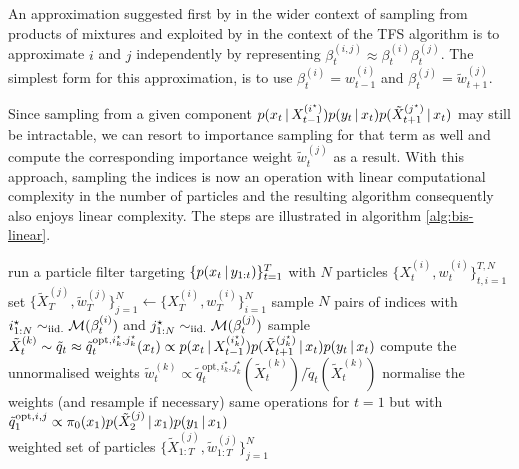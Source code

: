 An approximation suggested first by \citet{briers05} in the wider context of sampling from products of mixtures and exploited by \citet{fearnhead10, taghavi12} in the context of the TFS algorithm is to approximate $i$ and $j$ independently by representing $\beta^{(i,j)}_{t}\approx \beta^{(i)}_{t}\beta^{(j)}_{t}$. The simplest form for this approximation, is to use $\beta^{(i)}_{t} = w^{(i)}_{t-1}$ and $\beta^{(j)}_{t}=\tilde w^{(j)}_{t+1}$. 

Since sampling from a given component $p(x_{t}\,|\, X^{(i^{\star})}_{t-1})p(y_{t}\,|\, x_{t})p(\tilde X^{(j^{\star})}_{t+1}\,|\, x_{t})$ may still be intractable, we can resort to importance sampling for that term as well and compute the corresponding importance weight $\tilde w_{t}^{(j)}$ as a result.
With this approach, sampling the indices is now an operation with linear computational complexity in the number of particles and the resulting algorithm consequently also enjoys linear complexity. 
The steps are illustrated in algorithm \ref{alg:bis-linear}. 
%
\begin{algorithm}[!h]\small
	\caption{\label{alg:bis-linear}}
	\begin{algorithmic}[1]
		\State run a particle filter targeting $\{p(x_{t}\,|\, y_{1:t})\}_{t=1}^{T}$ with $N$ particles $\{X^{(i)}_{t}, w^{(i)}_{t}\}_{t,i=1}^{T,N}$
		\State set $\{\tilde X^{(j)}_{T},\tilde w^{(j)}_{T}\}_{j=1}^{N}\leftarrow \{X^{(i)}_{T},w^{(i)}_{T}\}_{i=1}^{N}$
			\State sample $N$ pairs of indices with $i^{\star}_{1:N} \sim_{\mathrm{iid.}} \mathcal M(\beta^{(i)}_{t})$ and $j^{\star}_{1:N}\sim_{\mathrm{iid.}} \mathcal M(\beta^{(j)}_{t})$
				\State sample $\tilde X^{(k)}_{t}\sim \tilde  q_{t} \approx \tilde q_{t}^{\text{opt}, i^{\star}_{k}, j^{\star}_{k}}(x_{t}) \propto p(x_{t}\,|\, X^{(i^{\star}_{k})}_{t-1})p(\tilde X^{(j^{\star}_{k})}_{t+1}\,|\, x_{t})p(y_{t}\,|\, x_{t})$
	    			\State compute the unnormalised weights $\tilde w^{(k)}_{t} \propto \tilde q^{\text{opt}, i^{\star}_{k},j^{\star}_{k}}_{t}(\tilde X^{(k)}_{t})/\tilde q_{t}(\tilde X^{(k)}_{t})$
			\EndFor
			\State normalise the weights (and resample if necessary)
		\EndFor
	\State same operations for $t=1$ but with $\tilde q^{\text{opt},i,j}_{1} \propto \pi_{0}(x_{1})p(\tilde X^{(j)}_{2}\,|\, x_{1})p(y_{1}\,|\, x_{1})$\\
	\Return weighted set of particles $\{\tilde X^{(j)}_{1:T}, \tilde w^{(j)}_{1:T}\}_{j=1}^{N}$
	\end{algorithmic}
\end{algorithm}

